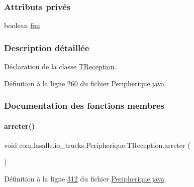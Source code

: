 \subsubsection*{Attributs privés}
\begin{DoxyCompactItemize}
\item 
boolean \hyperlink{classcom_1_1lasalle_1_1io__trucks_1_1_peripherique_1_1_t_reception_af9ba647e407a9a150e1c37972233dbf9}{fini}
\end{DoxyCompactItemize}


\subsubsection{Description détaillée}
Déclaration de la classe \hyperlink{classcom_1_1lasalle_1_1io__trucks_1_1_peripherique_1_1_t_reception}{T\+Reception}. 

Définition à la ligne \hyperlink{_peripherique_8java_source_l00260}{260} du fichier \hyperlink{_peripherique_8java_source}{Peripherique.\+java}.



\subsubsection{Documentation des fonctions membres}
\mbox{\label{classcom_1_1lasalle_1_1io__trucks_1_1_peripherique_1_1_t_reception_ad02425d61d6c923521c8f66f6b854b3c}} 
\paragraph{\texorpdfstring{arreter()}{arreter()}}
{\footnotesize\ttfamily void com.\+lasalle.\+io\+\_\+trucks.\+Peripherique.\+T\+Reception.\+arreter (\begin{DoxyParamCaption}{ }\end{DoxyParamCaption})}



Définition à la ligne \hyperlink{_peripherique_8java_source_l00312}{312} du fichier \hyperlink{_peripherique_8java_source}{Peripherique.\+java}.



